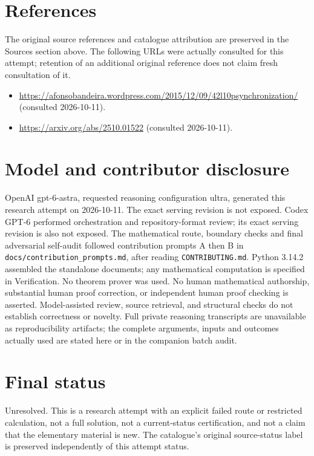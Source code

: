 \documentclass[11pt]{article}
\begin{document}
\section{References}
The original source references and catalogue attribution are preserved in the
Sources section above. The following URLs were actually consulted for this attempt;
retention of an additional original reference does not claim fresh consultation of it.
\begin{itemize}
\item \url{https://afonsobandeira.wordpress.com/2015/12/09/42l10psynchronization/} (consulted 2026-10-11). 
\item \url{https://arxiv.org/abs/2510.01522} (consulted 2026-10-11). 
\end{itemize}
\section{Model and contributor disclosure}
OpenAI gpt-6-astra, requested reasoning configuration ultra, generated this research
attempt on 2026-10-11. The exact serving revision is not exposed. Codex GPT-6
performed orchestration and repository-format review; its exact serving revision
is also not exposed. The mathematical route, boundary checks and final adversarial
self-audit followed contribution prompts A then B in
\texttt{docs/contribution\_prompts.md}, after reading \texttt{CONTRIBUTING.md}.
Python 3.14.2 assembled the standalone documents; any mathematical computation is
specified in Verification. No theorem prover was used. No human mathematical
authorship, substantial human proof correction, or independent human proof checking
is asserted. Model-assisted review, source retrieval, and structural checks do not
establish correctness or novelty. Full private reasoning transcripts are unavailable
as reproducibility artifacts; the complete arguments, inputs and outcomes actually
used are stated here or in the companion batch audit.
\section{Final status}
Unresolved. This is a research attempt with an explicit failed route or restricted
calculation, not a full solution, not a current-status certification, and not a claim
that the elementary material is new. The catalogue's original source-status label
is preserved independently of this attempt status.
\end{document}
